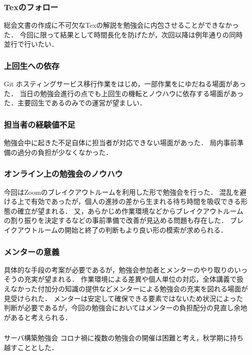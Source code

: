 \subsubsection*{Texのフォロー}
総会文書の作成に不可欠なTexの解説を勉強会に内包させることができなかった．
今回に限って結果として時間長化を防げたが，次回以降は例年通りの同時並行で行いたい．
\subsubsection*{上回生への依存}
Git ホスティングサービス移行作業をはじめ，一部作業を\fourthGrade{}にゆだねる場面があった．
当日の勉強会進行の点でも上回生の機転とノウハウに依存する場面があった．主要回生である\secondGrade{}のみでの運営が望ましい．
\subsubsection*{担当者の経験値不足}
勉強会中に起きた不足自体に担当者が対応できない場面があった．
局内事前準備の過分の負担が少なくなかった．
\subsubsection*{オンライン上の勉強会のノウハウ}
今回はZoomのブレイクアウトルームを利用した形で勉強会を行った．
混乱を避ける上で有効であったが，個人の進捗の差から生まれる待ち時間を吸収できる形態の確立が望まれる．
又，あらかじめ作業環境などからブレイクアウトルームの割り振りを決定するなどの事前準備で改善が見込める問題も存在した．
ブレイクアウトルームの開始と終了の判断もより良い形の模索が求められる．
\subsubsection*{メンターの意義}
具体的な手段の考案が必要であるが，勉強会参加者とメンターのやり取りのいっそうの充実が望まれる．
作業環境による差異や個人単位の対応，全体講義で扱えなかった付加分の知識の提供などメンターによる勉強会の充実を図れる場面が見受けられた．
メンターは安定して確保できる要素ではないため状況によった判断が必要であるが，今回の勉強会においてはメンターの負担配分の見直し余地があると考えられる．

\subsubsection*{}サーバ構築勉強会
コロナ禍に複数の勉強会の開催は困難と考え，秋学期に持ち越すこととした．

